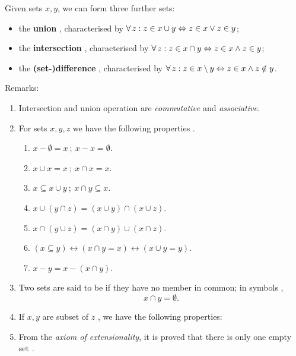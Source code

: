 \documentclass[12pt]{book}
\begin{document}
Given sets $x, y$, we can form three further sets:
\begin{itemize}
\item the \textbf{union} , characterised by $\fa\, z : z \in x \cup y \Lra z \in x \vee z \in y$;
\item the \textbf{intersection} , characterised by $\fa\, z : z \in x \cap y \Lra z \in x \wedge z \in y$;
\item the \textbf{(set-)difference} , characterised by $\fa\, z : z \in x \sm y \Lra z \in x \wedge z \notin y$.
\end{itemize}
Remarks:
\begin{enumerate}
 \item Intersection and union operation are {\it commutative} and {\it associative}.
 \item For sets $x, y, z$ we have the following properties \cite{h1}.
  \begin{enumerate}
  \item $x - \emptyset = x\ ;\ x - x = \emptyset $. 
  \item $x \cup x = x\ ;\ x \cap x = x $.
  \item $x \subseteq x \cup y\ ;\ x \cap y \subseteq x$.
  \item $x \cup (y \cap z) = (x \cup y) \cap (x \cup z)$.
  \item $x \cap (y \cup z) = (x \cap y) \cup (x \cap z)$.
  \item $(x \subseteq y) \leftrightarrow (x \cap y=x) \leftrightarrow (x \cup y = y)$.
  \item $x - y = x - (x \cap y)$.
  \end{enumerate}
  \item Two sets are said to be  if they have no member in common; in symbols \cite{h1},
    $$ x \cap y = \emptyset .$$
  \item If $x, y $ are subset of $z$ , we have the following properties:
    \begin{enumerate}
	\item $z - ( z - x ) = x$;
	\item $(x \subseteq y) \leftrightarrow [(z - y) \subseteq (z - x)]}$;
	\item $x \cup (z - x) = z$;
	\item $z - (x \cup y) = (z - x) \cap (z - y)$;
	\item $z - (x \cap y) = (z - x) \cup (z - y)$.
	\end{enumerate}
  \item From the {\it axiom of extensionality}, it is proved that there is only one empty set \cite{h1}.
\end{enumerate}
\end{document}
